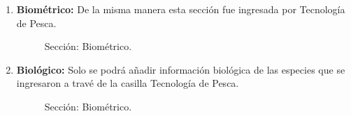 \documentclass[a4paper,oneside,11pt]{book}
\begin{document}
\begin{itemize}
\begin{enumerate}
   
\newpage


\item \textbf{Biométrico:} De la misma manera esta sección fue ingresada por Tecnología de Pesca.

\begin{figure} [!h]
\begin{center}
\caption{Sección: Biométrico.}
\end{center}
\end{figure}


\item \textbf{Biológico:}  Solo se podrá añadir información biológica de las especies que se ingresaron a travé de la casilla Tecnología de Pesca.

\begin{figure} [!h]
\begin{center}
\caption{Sección: Biométrico.}
\end{center}
\end{figure}


\end{enumerate}
\end{itemize}
\end{document}
